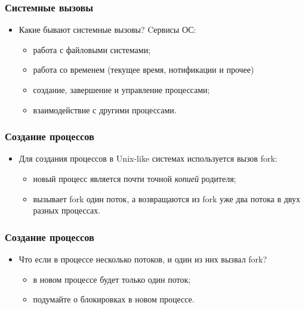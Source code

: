 \begin{frame}
\frametitle{Системные вызовы}
\begin{itemize}
    \item<1->Какие бывают системные вызовы? Cервисы ОС:
    \begin{itemize}
        \item<2->работа с файловыми системами;
        \item<3->работа со временем (текущее время, нотификации и прочее)
        \item<4->создание, завершение и управление процессами;
        \item<5->взаимодействие с другими процессами.
    \end{itemize}
\end{itemize}
\end{frame}

\begin{frame}
\frametitle{Создание процессов}
\begin{itemize}
    \item<1->Для создания процессов в Unix-like системах используется
         вызов fork:
    \begin{itemize}
        \item<3->новый процесс является почти точной \emph{копией} родителя;
        \item<4->вызывает fork один поток, а возвращаются из fork уже два
             потока в двух разных процессах.
    \end{itemize}
\end{itemize}
\end{frame}

\begin{frame}
\frametitle{Создание процессов}
\begin{itemize}
    \item<1->Что если в процессе несколько потоков, и один из них вызвал fork?
    \begin{itemize}
        \item<2->в новом процессе будет только один поток;
        \item<3->подумайте о блокировках в новом процессе.
    \end{itemize}
\end{itemize}
\end{frame}

